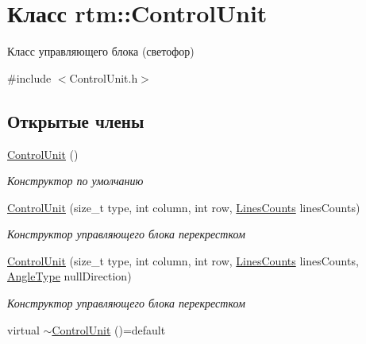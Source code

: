\hypertarget{classrtm_1_1_control_unit}{}\section{Класс rtm\+:\+:Control\+Unit}
\label{classrtm_1_1_control_unit}


Класс управляющего блока (светофор)  




{\ttfamily \#include $<$Control\+Unit.\+h$>$}

\subsection*{Открытые члены}
\begin{DoxyCompactItemize}
\item 
\mbox{\label{classrtm_1_1_control_unit_a6faae9a6512a9f75fbe4c1c4b2f88090}} 
\hyperlink{classrtm_1_1_control_unit_a6faae9a6512a9f75fbe4c1c4b2f88090}{Control\+Unit} ()
\begin{DoxyCompactList}\small\item\em Конструктор по умолчанию \end{DoxyCompactList}\item 
\hyperlink{classrtm_1_1_control_unit_ac8a261d763f6d6632ce2c872710fe6b4}{Control\+Unit} (size\+\_\+t type, int column, int row, \hyperlink{namespacertm_a14457f3088a92b86a96686b72d3e4eea}{Lines\+Counts} lines\+Counts)
\begin{DoxyCompactList}\small\item\em Конструктор управляющего блока перекрестком \end{DoxyCompactList}\item 
\hyperlink{classrtm_1_1_control_unit_a2c2c1f0f0196f0af82009f94bb875736}{Control\+Unit} (size\+\_\+t type, int column, int row, \hyperlink{namespacertm_a14457f3088a92b86a96686b72d3e4eea}{Lines\+Counts} lines\+Counts, \hyperlink{namespacertm_a69dc82b16a0148c10962caa83d930f89}{Angle\+Type} null\+Direction)
\begin{DoxyCompactList}\small\item\em Конструктор управляющего блока перекрестком \end{DoxyCompactList}\item 
\mbox{\label{classrtm_1_1_control_unit_a29e6e147ae6212c9bc7cc13c5d8fdc2c}} 
virtual \hyperlink{classrtm_1_1_control_unit_a29e6e147ae6212c9bc7cc13c5d8fdc2c}{$\sim$\+Control\+Unit} ()=default

\end{DoxyCompactItemize}
